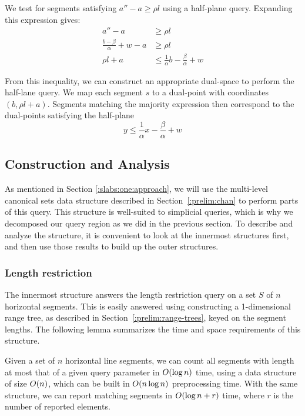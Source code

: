 We test for segments satisfying $a'' - a \geq \rho l$ using a half-plane query.  Expanding this expression gives:
\[
\begin{split}
a'' - a &\geq \rho l \\
%
\frac{b - \beta}{\alpha} + w - a &\geq \rho l \\
%
\rho l + a &\leq \frac{1}{\alpha} b - \frac{\beta}{\alpha} + w
%
\end{split}
\]

From this inequality, we can construct an appropriate dual-space to perform the half-lane query.  We map each segment $s$ to a dual-point with coordinates $(b, \rho l + a)$. Segments matching the majority expression then correspond to the dual-points satisfying the half-plane 
\[
y \leq \frac{1}{\alpha} x - \frac{\beta}{\alpha} + w
\]

\subsection{Construction and Analysis}
\label{:slabs:one:analysis}

As mentioned in Section \ref{:slabs:one:approach}, we will use the multi-level canonical sets data structure described in Section~\ref{:prelim:chan} to perform parts of this query.  This structure is well-suited to simplicial queries, which is why we decomposed our query region as we did in the previous section. To describe and analyze the structure, it is convenient to look at the innermost structures first, and then use those results to build up the outer structures.


\subsubsection{Length restriction}

The innermost structure answers the length restriction query on a set $S$ of $n$ horizontal segments. This is easily answered using constructing a 1-dimensional range tree, as described in Section~\ref{:prelim:range-trees}, keyed on the segment lengths. The following lemma summarizes the time and space requirements of this structure.

\begin{lemma}
\label{lem:slabs:one:step1}
Given a set of $n$ horizontal line segments, we can count all segments with length at most that of a given query parameter in $O\!\left(\log{n}\right)$ time, using a data structure of size $O\!\left(n\right)$, which can be built in $O\!\left(n \log{n}\right)$ preprocessing time. With the same structure, we can report matching segments in $O\!\left(\log{n} + r\right)$ time, where $r$ is the number of reported elements.
\end{lemma}


